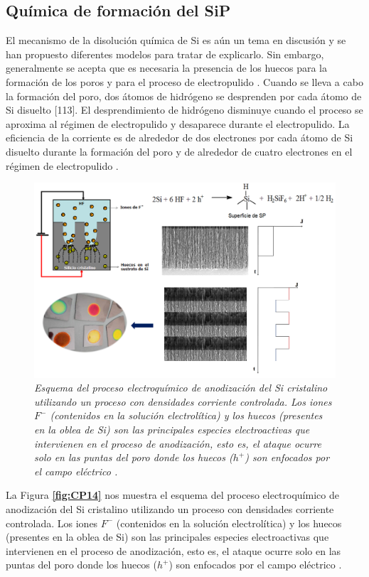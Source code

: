 \documentclass[a4paper,11pt,]{book}
\begin{document}
\subsection{Química de formación del SiP}
El mecanismo de la  disolución química de Si es aún un tema en discusión y se han propuesto diferentes modelos para tratar de explicarlo. Sin embargo, generalmente se acepta que es necesaria la presencia de los huecos para la formación de los poros y para el proceso de electropulido \cite{110, 112}. Cuando se lleva a cabo la formación del poro, dos átomos de hidrógeno se desprenden por cada átomo de Si disuelto [113]. El desprendimiento de hidrógeno disminuye cuando el proceso se aproxima al régimen de electropulido y desaparece durante el electropulido. La eficiencia de la corriente es de alrededor de dos electrones por cada átomo de Si disuelto durante la formación del poro y de alrededor de cuatro electrones en el régimen de electropulido \cite{112}.
\begin{figure}[H]
	\centering
	\includegraphics[scale=.4]{../Images/spfor}
	\caption{\emph{Esquema  del proceso electroquímico de anodización del Si cristalino utilizando
			un proceso con densidades corriente controlada. Los iones $F^-$ (contenidos en la solución electrolítica)
			y los huecos (presentes en la oblea de Si) son las principales especies electroactivas que intervienen
			en el proceso de anodización, esto es, el ataque ocurre solo en las puntas del poro donde los huecos
			($h^+$) son enfocados por el campo eléctrico \cite{114}.}}
	\label{fig:Qf}
\end{figure}
La Figura \textbf{\ref{fig:CP14}} nos muestra el esquema  del proceso electroquímico de anodización del Si cristalino utilizando
un proceso con densidades corriente controlada. Los iones $F^-$ (contenidos en la solución electrolítica) y los huecos (presentes en la oblea de Si) son las principales especies electroactivas que intervienen en el proceso de anodización, esto es, el ataque ocurre solo en las puntas del poro donde los huecos ($h^+$) son enfocados por el campo eléctrico \cite{114}. 
\end{document}
